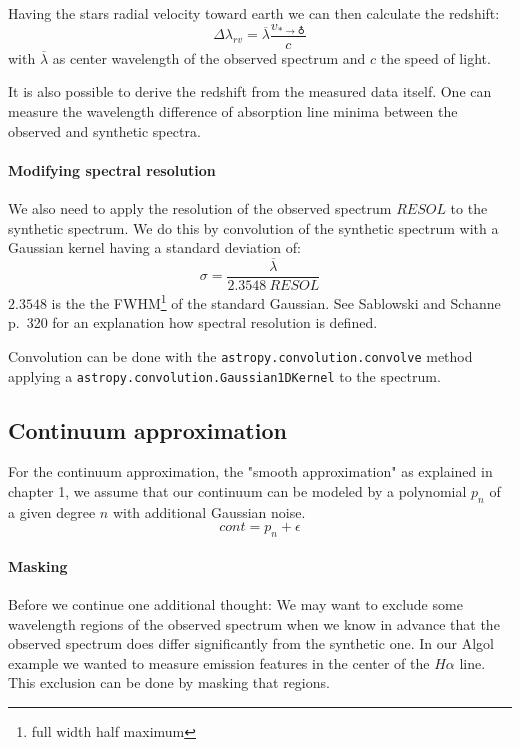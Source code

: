 \documentclass[10pt,a4paper,notitlepage,twocolumn]{article}
\begin{document}
Having the stars radial velocity toward earth we can then calculate the redshift:
\begin{equation}
	\label{eq:dl}
	\Delta\lambda_{rv} = \overline{\lambda} \frac{v_{* \rightarrow \earth}}{c}
\end{equation}
with $\overline{\lambda}$ as center wavelength of the observed spectrum and $c$ the speed of light.

It is also possible to derive the redshift from the measured data itself.
One can measure the wavelength difference of absorption line minima between the observed and synthetic spectra.

\paragraph{Modifying spectral resolution}
We also need to apply the resolution of the observed spectrum $RESOL$ to the synthetic spectrum.
We do this by convolution of the synthetic spectrum with a Gaussian kernel having a standard deviation of:
\begin{equation}
	\sigma = \frac{\overline{\lambda}}{2.3548\ RESOL}
\end{equation}
$2.3548$ is the the FWHM\footnote{full width half maximum} of the standard Gaussian. See Sablowski and Schanne \cite{SablowskiSchanne2018} p.\ 320 for an explanation how spectral resolution is defined.

Convolution can be done with the \verb|astropy.convolution.convolve| method applying a \verb|astropy.convolution.Gaussian1DKernel| to the spectrum.

\subsection{Continuum approximation}

For the continuum approximation, the "smooth approximation" as explained in chapter 1, we assume that our continuum can be modeled by a polynomial $p_n$ of a given degree $n$ with additional Gaussian noise.
\begin{equation}
	\label{eq:cont_model}
	cont = p_n + \epsilon
\end{equation}

\paragraph{Masking}
Before we continue one additional thought:
We may want to exclude some wavelength regions of the observed spectrum when we know in advance that the observed spectrum does differ significantly from the synthetic one.
In our Algol example we wanted to measure emission features in the center of the $H\alpha$ line.
This exclusion can be done by masking that regions.
\end{document}
